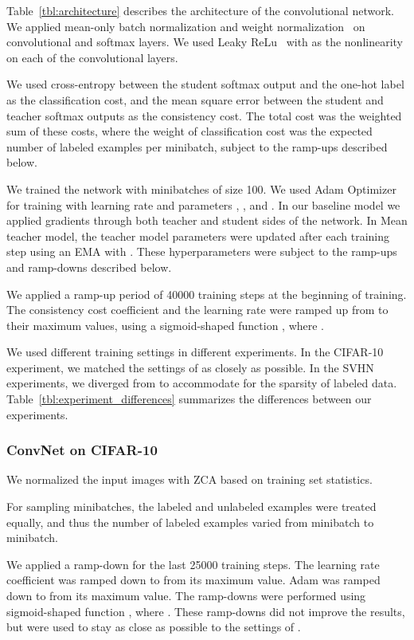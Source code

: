 \documentclass{article}
\begin{document}
Table~\ref{tbl:architecture} describes the architecture of the convolutional network.
We applied mean-only batch normalization and weight normalization~\citep{salimans_weight_2016} on convolutional and softmax layers.
We used Leaky ReLu~\citep{maas_rectifier_2013} with  as the nonlinearity on each of the convolutional layers.

We used cross-entropy between the student softmax output and the one-hot label as the classification cost, and the mean square error between the student and teacher softmax outputs as the consistency cost.
The total cost was the weighted sum of these costs, where the weight of classification cost was the expected number of labeled examples per minibatch, subject to the ramp-ups described below.

We trained the network with minibatches of size 100.
We used Adam Optimizer~\citep{kingma_adam:_2014} for training with learning rate  and parameters , , and .
In our baseline  model we applied gradients through both teacher and student sides of the network.
In Mean teacher model, the teacher model parameters were updated after each training step using an EMA with .
These hyperparameters were subject to the ramp-ups and ramp-downs described below.

We applied a ramp-up period of 40000 training steps at the beginning of training. The consistency cost coefficient and the learning rate were ramped up from  to their maximum values, using a sigmoid-shaped function , where . 

We used different training settings in different experiments.
In the CIFAR-10 experiment, we matched the settings of \citet{laine_temporal_2016} as closely as possible.
In the SVHN experiments, we diverged from \citet{laine_temporal_2016} to accommodate for the sparsity of labeled data.
Table~\ref{tbl:experiment_differences} summarizes the differences between our experiments.

\subsubsection{ConvNet on CIFAR-10}
\label{appendix:cifar_description}

We normalized the input images with ZCA based on training set statistics.

For sampling minibatches, the labeled and unlabeled examples were treated equally, and thus the number of labeled examples varied from minibatch to minibatch.

We applied a ramp-down for the last 25000 training steps.
The learning rate coefficient was ramped down to  from its maximum value.
Adam  was ramped down to  from its maximum value.
The ramp-downs were performed using sigmoid-shaped function , where .
These ramp-downs did not improve the results, but were used to stay as close as possible to the settings of \citet{laine_temporal_2016}.
\end{document}
